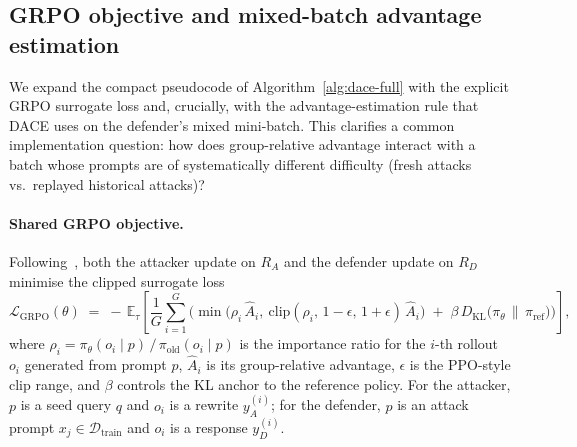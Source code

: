 \documentclass{article}
\newcommand{\method}{\textsc{DACE}\xspace}
\newcommand{\KL}{D_{\mathrm{KL}}}
\begin{document}
\subsection{GRPO objective and mixed-batch advantage estimation}
\label{apdx:grpo}

We expand the compact pseudocode of Algorithm~\ref{alg:dace-full} with the explicit GRPO surrogate loss and, crucially, with the advantage-estimation rule that \method uses on the defender's mixed mini-batch. This clarifies a common implementation question: how does group-relative advantage interact with a batch whose prompts are of systematically different difficulty (fresh attacks vs.\ replayed historical attacks)?

\paragraph{Shared GRPO objective.} Following~\citet{shao2024grpo, guo2025deepseek}, both the attacker update on $R_A$ and the defender update on $R_D$ minimise the clipped surrogate loss
\begin{equation}
  \mathcal{L}_{\mathrm{GRPO}}(\theta) \;=\; -\,\mathbb{E}_{\tau}\!\left[\frac{1}{G}\sum_{i=1}^{G}\Big(\min\!\big(\rho_i\,\hat A_i,\ \mathrm{clip}(\rho_i,\,1{-}\epsilon,\,1{+}\epsilon)\,\hat A_i\big) \;+\; \beta\,\KL\!\big(\pi_\theta\,\|\,\pi_{\mathrm{ref}}\big)\Big)\right],
  \label{eq:grpo-loss}
\end{equation}
where $\rho_i = \pi_\theta(o_i\mid p)\,/\,\pi_{\mathrm{old}}(o_i\mid p)$ is the importance ratio for the $i$-th rollout $o_i$ generated from prompt $p$, $\hat A_i$ is its group-relative advantage, $\epsilon$ is the PPO-style clip range, and $\beta$ controls the KL anchor to the reference policy. For the attacker, $p$ is a seed query $q$ and $o_i$ is a rewrite $y_A^{(i)}$; for the defender, $p$ is an attack prompt $x_j\in\mathcal{D}_{\mathrm{train}}$ and $o_i$ is a response $y_D^{(i)}$.
\end{document}
